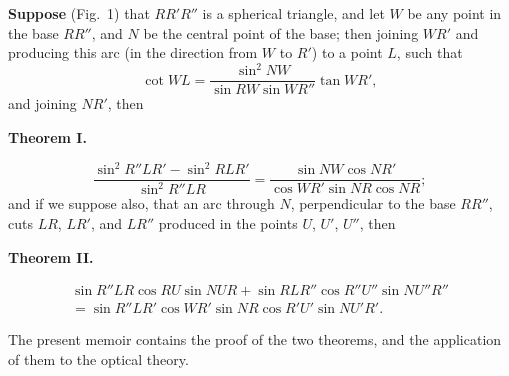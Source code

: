 \documentclass[11pt,a4paper]{book}
\theoremstyle{plain}
\begin{document}
\textbf{Suppose} (Fig.~1) that $RR'R''$ is a spherical triangle, and let $W$ be any point in the base $RR''$, and $N$ be the central point of the base; then joining $WR'$ and producing this arc (in the direction from $W$ to $R'$) to a point $L$, such that
\[
\cot WL=\frac{\sin^2NW}{\sin RW\sin WR''}\tan WR',
\]
and joining $NR'$, then

\begin{center}
\textbf{Theorem I.}
\end{center}
\[
\frac{\sin^2R''LR'-\sin^2RLR'}{\sin^2R''LR}
=\frac{\sin NW\cos NR'}{\cos WR'\sin NR\cos NR};
\]
and if we suppose also, that an arc through $N$, perpendicular to the base $RR''$, cuts $LR$, $LR'$, and $LR''$ produced in the points $U$, $U'$, $U''$, then

\begin{center}
\textbf{Theorem II.}
\end{center}
\begin{multline*}
\sin R''LR\cos RU\sin NUR+\sin RLR''\cos R''U''\sin NU''R''\\
=\sin R''LR'\cos WR'\sin NR\cos R'U'\sin NU'R'.
\end{multline*}

The present memoir contains the proof of the two theorems, and the application of them to the optical theory.
\end{document}
